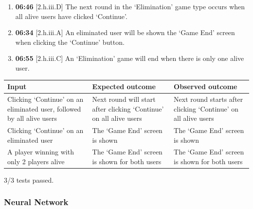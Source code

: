\documentclass{article}
\begin{document}
\begin{enumerate}
    \begin{enumerate}
        \item \textbf{06:46} [2.h.iii.D] The next round in the `Elimination' game type occurs when all alive users have clicked `Continue'.
        \item \textbf{06:34} [2.h.iii.A] An eliminated user will be shown the `Game End' screen when clicking the `Continue' button.
        \item \textbf{06:55} [2.h.iii.C] An `Elimination' game will end when there is only one alive user.
    \end{enumerate}

    \begin{table}[H]
    \centering
        \begin{tabularx}{\textwidth}{|L|L|L|}
        \hline
        \textbf{Input} & \textbf{Expected outcome} & \textbf{Observed outcome} \\\hline
        Clicking `Continue' on an eliminated user, followed by all alive users & Next round will start after clicking `Continue' on all alive users & Next round starts after clicking `Continue' on all alive users \\\hline
        Clicking `Continue' on an eliminated user & The `Game End' screen is shown & The `Game End' screen is shown \\\hline
        A player winning with only 2 players alive & The `Game End' screen is shown for both users & The `Game End' screen is shown for both users \\\hline
        \end{tabularx}
    \end{table}

    3/3 tests passed. \\
    
\end{enumerate}

\subsubsection{Neural Network}
\end{document}

